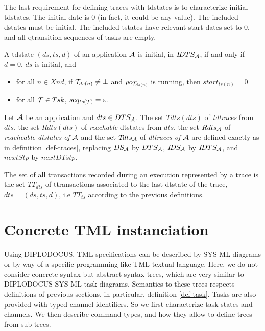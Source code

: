 \documentclass{article}
\begin{document}
The last requirement for defining traces with tdstates is to characterize initial tdstates. The initial date is 0 (in fact, it could be any value). The included dstates must be initial. The included tstates have relevant start dates set to 0, and all qtransition sequences of tasks are empty.
\begin{definition}\label{def-itdst} A tdstate $(ds,ts,d)$ of an application ${\cal A}$ is initial, in $I\!DTS_{\cal A}$,  if and only if $d=0$, $ds$ is initial, and
\begin{itemize}
\item for all $n\in X\!nd$, if ${\cal T}_{ds(n)}\neq \bot$ and $pc_{{\cal T}_{ds(n)}}$ is running, then $start_{ts(n)}=0$
\item for all ${\cal T}\in Tsk$, $seq_{ts({\cal T})}=\varepsilon$.
\end{itemize}
\end{definition}
\begin{definition}\label{def-tdtraces} Let ${\cal A}$ be an application and $dts\in DTS_{\cal A}$. The set $Tdts(dts)$ of {\em tdtraces} from $dts$, the set $Rdts(dts)$ of {\em reachable} dtstates from $dts$, the set $Rdts_{\cal A}$ of {\em reacheable dtstates of} ${\cal A}$ and the set $T\!dts_{\cal A}$ of {\em dttraces of} ${\cal A}$ are defined exactly as in definition \ref{def-traces}, replacing $DS_{\cal A}$ by $DTS_{\cal A}$, $I\!DS_{\cal A}$ by $I\!DTS_{\cal A}$, and $nextStp$ by $nextDT\!stp$.

\end{definition}

The set of all transactions recorded during an execution represented by a trace is the set $TT_{dts}$ of ttransactions associated to the last dtstate of the trace, $dts=(ds,ts,d)$, i.e $TT_{ts}$ according to the previous definitions.

\section{Concrete TML instanciation}\label{sec-TML}
Using DIPLODOCUS, TML specifications can be described by SYS-ML diagrams or by way of a specific programming-like TML textual language. Here, we do not consider concrete syntax but abstract syntax trees, which are very similar to DIPLODOCUS SYS-ML task diagrams.  Semantics to these trees respects definitions of previous sections, 
in particular, definition \ref{def-task}. Tasks are also provided with typed channel identifiers. So we first characterize task states and channels. We then describe command types, and how they allow to define trees from sub-trees.
\end{document}
